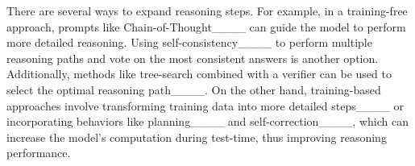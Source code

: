 There are several ways to expand reasoning steps. For example, in a training-free approach, prompts like Chain-of-Thought____ can guide the model to perform more detailed reasoning. Using self-consistency____ to perform multiple reasoning paths and vote on the most consistent answers is another option. Additionally, methods like tree-search combined with a verifier can be used to select the optimal reasoning path____. On the other hand, training-based approaches involve transforming training data into more detailed steps____ or incorporating behaviors like planning____ and self-correction____, which can increase the model’s computation during test-time, thus improving reasoning performance.